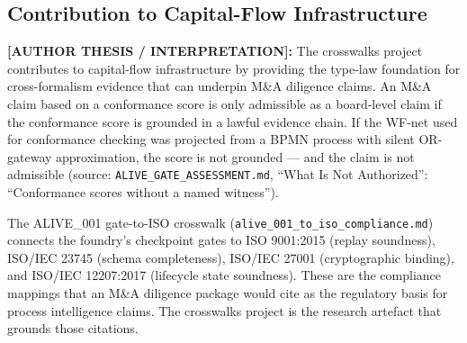 \subsection{Contribution to Capital-Flow Infrastructure}
\label{sec:crosswalks-contribution-capital}

\textbf{[AUTHOR THESIS / INTERPRETATION]:} The crosswalks project contributes to capital-flow
infrastructure by providing the type-law foundation for cross-formalism evidence that can
underpin M\&A diligence claims. An M\&A claim based on a conformance score is only admissible
as a board-level claim if the conformance score is grounded in a lawful evidence chain. If the
WF-net used for conformance checking was projected from a \textsc{BPMN} process with silent
\textsc{OR}-gateway approximation, the score is not grounded --- and the claim is not admissible
(source: \texttt{ALIVE\_GATE\_ASSESSMENT.md}, ``What Is Not Authorized'': ``Conformance scores
without a named witness'').

The \textsc{ALIVE\_001} gate-to-\textsc{ISO} crosswalk (\texttt{alive\_001\_to\_iso\_compliance.md})
connects the foundry's checkpoint gates to \textsc{ISO} 9001:2015 (replay soundness), \textsc{ISO/IEC}
23745 (schema completeness), \textsc{ISO/IEC} 27001 (cryptographic binding), and \textsc{ISO/IEC}
12207:2017 (lifecycle state soundness). These are the compliance mappings that an M\&A diligence
package would cite as the regulatory basis for process intelligence claims. The crosswalks project
is the research artefact that grounds those citations.
